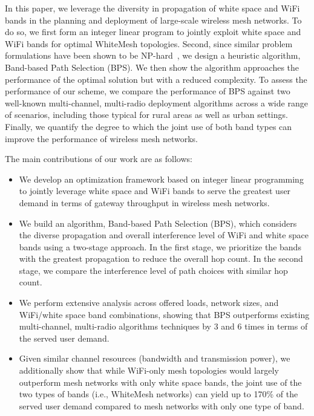 In this paper, we leverage the diversity in propagation of
white space and WiFi bands in the planning and deployment
of large-scale wireless mesh networks. To do so, we first form an
integer linear program to jointly exploit 
white space and WiFi bands for optimal WhiteMesh topologies.
Second, since similar problem formulations have been shown to be 
NP-hard~\cite{jain2005impact}, we design a heuristic algorithm, 
Band-based Path Selection (BPS). We then
show the algorithm approaches the performance of the 
optimal solution but with a reduced complexity. To assess the 
performance of our scheme, we compare the performance of 
BPS against two well-known multi-channel, multi-radio deployment 
algorithms across a wide range of scenarios, including those
typical for rural areas as well as urban settings. Finally, we
quantify the degree to which the joint use of both band types can improve the 
performance of wireless mesh networks.

The main contributions of our work are as follows:
\begin{itemize}
\item We develop an optimization framework based on integer
linear programming to jointly leverage white space and WiFi bands
to serve the greatest user demand in terms of gateway throughput 
in wireless mesh networks.  
\item We build an algorithm, Band-based Path 
Selection (BPS), which considers the diverse propagation 
and overall interference level of WiFi and white space bands using
a two-stage approach.  In the first stage, we prioritize the bands
with the greatest propagation to reduce the overall hop count. In the
second stage, we compare the interference level of path choices with
similar hop count. 
\item We perform extensive analysis across offered loads,
network sizes, and WiFi/white space band combinations, showing that BPS outperforms existing
multi-channel, multi-radio algorithms techniques by 3 and 6 times
in terms of the served user demand.  
\item Given similar channel resources
(bandwidth and transmission power), we additionally show that while
WiFi-only mesh topologies would largely outperform mesh networks with only
white space bands, the joint use of the two types of bands (i.e., WhiteMesh 
networks) can yield up to 170\% of the served user demand compared to mesh networks
with only one type of band.
\end{itemize}

